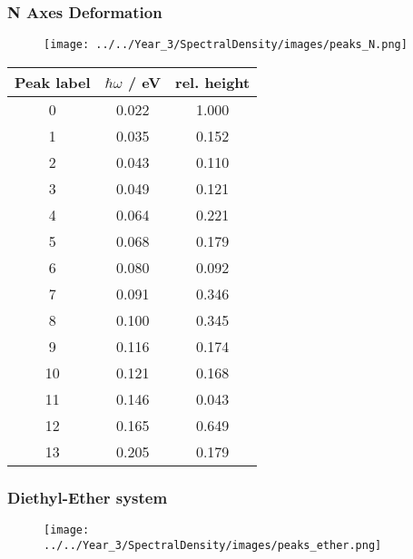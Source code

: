 \afterpartskip
\subsubsection{N Axes Deformation}
\label{subsubsec:specdens_N_axes}

\begin{figure}
    \centering
    \texttt{[image: ../../Year\_3/SpectralDensity/images/peaks\_N.png]}
\end{figure}


\begin{table}
    \centering
    \begin{tabular}{||c c c||}
    \hline
    Peak label & $\hbar \omega$ / eV & rel. height \\
    \hline\hline
    
     0 & 0.022 & 1.000 \\
     1 & 0.035 & 0.152 \\
     2 & 0.043 & 0.110 \\
     3 & 0.049 & 0.121 \\
     4 & 0.064 & 0.221 \\
     5 & 0.068 & 0.179 \\
     6 & 0.080 & 0.092 \\
     7 & 0.091 & 0.346 \\
     8 & 0.100 & 0.345 \\
     9 & 0.116 & 0.174 \\
     10 & 0.121 & 0.168 \\
     11 & 0.146 & 0.043 \\
     12 & 0.165 & 0.649 \\
     13 & 0.205 & 0.179 \\
    \hline 
    \end{tabular}
\end{table}

\afterpartskip
\subsubsection{Diethyl-Ether system}
\label{subsubsec:specdens_ether}

\begin{figure}
    \centering
    \texttt{[image: ../../Year\_3/SpectralDensity/images/peaks\_ether.png]}
\end{figure}

